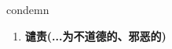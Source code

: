 
\begin{frame}
{\huge condemn}
\begin{center}
\begin{enumerate}\Large
  \item \textbf{谴责(...为不道德的、邪恶的)}
\end{enumerate}
\end{center}
\end{frame}
